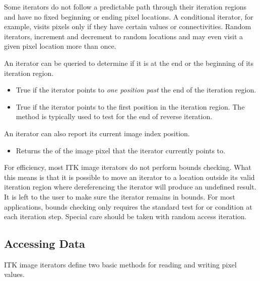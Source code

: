 Some iterators do not follow a predictable path through their iteration regions
and have no fixed beginning or ending pixel locations.  A conditional iterator,
for example, visits pixels only if 
they have certain values or connectivities.  Random iterators, increment and
decrement to random locations and may even visit a given pixel location more than
once.

An iterator can be queried to determine if it is at the end or the beginning of
its iteration region. 

\begin{itemize}
\item \textbf{} True if the iterator points to \emph{one
position past} the end of the iteration region.

\item \textbf{} True if the iterator points to the first
position in the iteration region.  The method is typically used to test for the
end of reverse iteration.

\end{itemize}

An iterator can also report its current image index position.

\begin{itemize}
\item \textbf{} Returns the 
of the image pixel that the iterator currently points to.
\end{itemize}

For efficiency, most ITK image iterators do not perform bounds checking.  What
this means is that it is possible to move an iterator to a location outside its
valid iteration region where dereferencing the iterator will produce an
undefined result. It is left to the user to make sure the 
iterator remains in bounds.  For most applications,  bounds checking only
requires the standard test for  or  condition at each
iteration step.  Special care should be taken with random access iteration.

\subsection{Accessing Data}
\label{sec:AccessingData}
ITK image iterators define two basic methods for reading and writing pixel
values.

